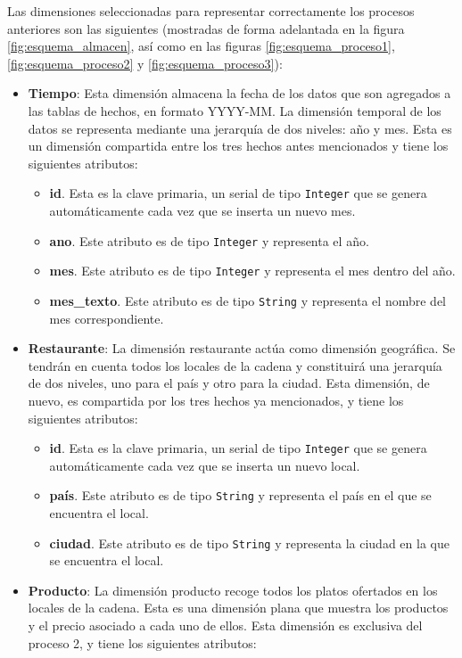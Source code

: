 \documentclass[12pt]{opticajnl}
\begin{document}
Las dimensiones seleccionadas para representar correctamente los procesos anteriores son las siguientes (mostradas de forma adelantada en la figura \ref{fig:esquema_almacen}, así como en las figuras \ref{fig:esquema_proceso1}, \ref{fig:esquema_proceso2} y \ref{fig:esquema_proceso3}):
\begin{itemize}
\item \textbf{Tiempo}: Esta dimensión almacena la fecha de los datos que son agregados a las tablas de hechos, en formato YYYY-MM. La dimensión temporal de los datos se representa mediante una jerarquía de dos niveles: año y mes. Esta es un dimensión compartida entre los tres hechos antes mencionados y tiene los siguientes atributos:
\begin{itemize}
\item \textbf{id}. Esta es la clave primaria, un serial de tipo \texttt{Integer} que se genera automáticamente cada vez que se inserta un nuevo mes.
\item \textbf{ano}. Este atributo es de tipo \texttt{Integer} y representa el año.
\item \textbf{mes}. Este atributo es de tipo \texttt{Integer} y representa el mes dentro del año.
\item \textbf{mes\_texto}. Este atributo es de tipo \texttt{String} y representa el nombre del mes correspondiente.
\end{itemize}
\item \textbf{Restaurante}: La dimensión restaurante actúa como dimensión geográfica. Se tendrán en cuenta todos los locales de la cadena y constituirá una jerarquía de dos niveles, uno para el país y otro para la ciudad. Esta dimensión, de nuevo, es compartida por los tres hechos ya mencionados, y tiene los siguientes atributos:
\begin{itemize}
\item \textbf{id}. Esta es la clave primaria, un serial de tipo \texttt{Integer} que se genera automáticamente cada vez que se inserta un nuevo local.
\item \textbf{país}. Este atributo es de tipo \texttt{String} y representa el país en el que se encuentra el local.
\item \textbf{ciudad}. Este atributo es de tipo \texttt{String} y representa la ciudad en la que se encuentra el local.
\end{itemize}
\item \textbf{Producto}: La dimensión producto recoge todos los platos ofertados en los locales de la cadena. Esta es una dimensión plana que muestra los productos y el precio asociado a cada uno de ellos. Esta dimensión es exclusiva del proceso 2, y tiene los siguientes atributos:

\end{itemize}
\end{document}
